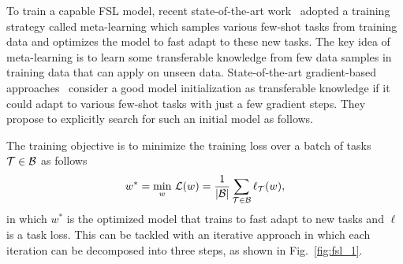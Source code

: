 To train a capable FSL model, recent state-of-the-art work~\cite{Gidaris_2018_CVPR, sung2018learning, finn2017model, li2017meta} adopted a training strategy called meta-learning which samples various few-shot tasks from training data and optimizes the model to fast adapt to these new tasks. The key idea of meta-learning is to learn some transferable knowledge from few data samples in training data that can apply on unseen data. 
State-of-the-art gradient-based approaches~\cite{finn2017model,sun2019mtl} consider a good model initialization as transferable knowledge if it could adapt to various few-shot tasks with just a few gradient steps. They propose to explicitly search for such an initial model as follows. 

The training objective is to minimize the training loss over a batch of tasks $\mathcal{T} \in \mathcal{B}$ as follows
\begin{equation}
\begin{split}
w^* &= \underset{w}{\text{min}} \ \mathcal{L}(w) = \frac{1}{|\mathcal{B}|} \sum_{\mathcal{T} \in \mathcal{B}} \ell_\mathcal{T}(w), \\
\end{split}
\label{eq:fed_def_adp}
\end{equation}
in which $w^*$ is the optimized model that trains to fast adapt to new tasks and $\ell$ is a task loss. This can be tackled with an iterative approach in which each iteration can be decomposed into three steps, as shown in Fig.~\ref{fig:fsl_1}.

